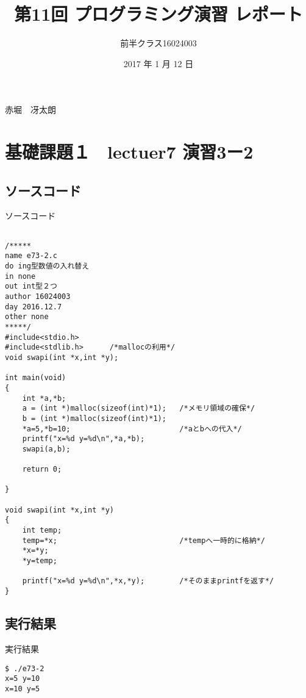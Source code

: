 \documentclass[a4j,titlepage]{jarticle}
\begin{document}

\title{第11回 プログラミング演習 レポート}

\author{前半クラス16024003}{赤堀　冴太朗}

\date{2017 年 1 月 12 日}
\maketitle


\section{基礎課題１　lectuer7 演習3ー2}
\subsection{ソースコード}
\begin{breakitembox}[l]{ソースコード}
\begin{verbatim}

/*****
name e73-2.c
do ing型数値の入れ替え
in none
out int型２つ
author 16024003
day 2016.12.7
other none
*****/
#include<stdio.h>
#include<stdlib.h>      /*mallocの利用*/
void swapi(int *x,int *y);

int main(void)
{
    int *a,*b;
    a = (int *)malloc(sizeof(int)*1);   /*メモリ領域の確保*/
    b = (int *)malloc(sizeof(int)*1);
    *a=5,*b=10;                         /*aとbへの代入*/
    printf("x=%d y=%d\n",*a,*b);
    swapi(a,b);

    return 0;

}

void swapi(int *x,int *y)
{
    int temp;
    temp=*x;                            /*tempへ一時的に格納*/
    *x=*y;
    *y=temp;

    printf("x=%d y=%d\n",*x,*y);        /*そのままprintfを返す*/
}
\end{verbatim}
\end{breakitembox}

\subsection{実行結果}
\begin{itembox}[l]{実行結果}
\begin{verbatim}
$ ./e73-2
x=5 y=10
x=10 y=5
\end{verbatim}
\end{itembox}
\end{document}

